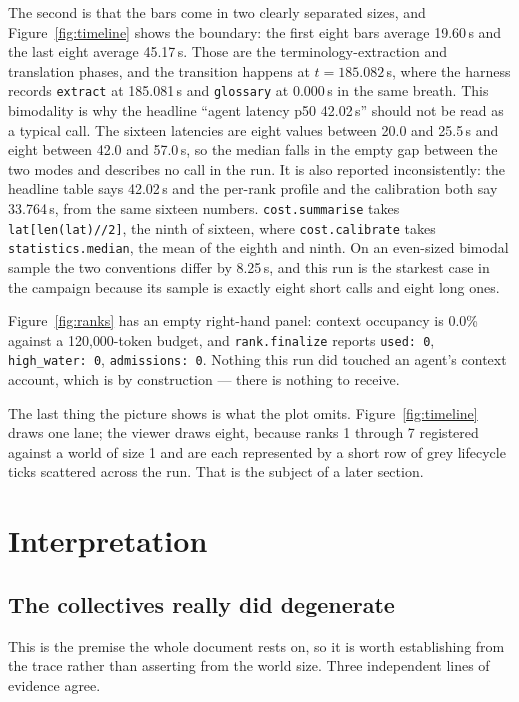 \documentclass[11pt]{article}
\begin{document}
The second is that the bars come in two clearly separated sizes, and Figure~\ref{fig:timeline}
shows the boundary: the first eight bars average 19.60\,s and the last eight average 45.17\,s.
Those are the terminology-extraction and translation phases, and the transition happens at
$t=185.082$\,s, where the harness records \texttt{extract} at 185.081\,s and \texttt{glossary} at
0.000\,s in the same breath. This bimodality is why the headline ``agent latency p50 42.02\,s''
should not be read as a typical call. The sixteen latencies are eight values between 20.0 and
25.5\,s and eight between 42.0 and 57.0\,s, so the median falls in the empty gap between the two
modes and describes no call in the run. It is also reported inconsistently: the headline table
says 42.02\,s and the per-rank profile and the calibration both say 33.764\,s, from the same
sixteen numbers. \texttt{cost.summarise} takes \texttt{lat[len(lat)//2]}, the ninth of sixteen,
where \texttt{cost.calibrate} takes \texttt{statistics.median}, the mean of the eighth and ninth.
On an even-sized bimodal sample the two conventions differ by 8.25\,s, and this run is the
starkest case in the campaign because its sample is exactly eight short calls and eight long ones.

Figure~\ref{fig:ranks} has an empty right-hand panel: context occupancy is 0.0\% against a
120{,}000-token budget, and \texttt{rank.finalize} reports \texttt{used: 0},
\texttt{high\_water: 0}, \texttt{admissions: 0}. Nothing this run did touched an agent's context
account, which is by construction --- there is nothing to receive.

The last thing the picture shows is what the plot omits. Figure~\ref{fig:timeline} draws one lane;
the viewer draws eight, because ranks 1 through 7 registered against a world of size 1 and are
each represented by a short row of grey lifecycle ticks scattered across the run. That is the
subject of a later section.

\section{Interpretation}

\subsection*{The collectives really did degenerate}

This is the premise the whole document rests on, so it is worth establishing from the trace rather
than asserting from the world size. Three independent lines of evidence agree.
\end{document}
